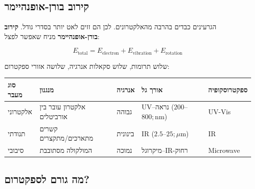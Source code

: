 \documentclass[
  hebrew,
  letterpaper,
  DIV=11,
  numbers=noendperiod]{scrreprt}
\newcounter{none} %
\begin{document}
\subsection{קירוב
בורן-אופנהיימר}\label{ux5e7ux5d9ux5e8ux5d5ux5d1-ux5d1ux5d5ux5e8ux5df-ux5d0ux5d5ux5e4ux5e0ux5d4ux5d9ux5d9ux5deux5e8}

הגרעינים כבדים בהרבה מהאלקטרונים. לכן הם זזים לאט יותר בסדרי גודל.
\textbf{קירוב בורן-אופנהיימר} מניח שאפשר לפצל:

\[E_\text{total} = E_\text{electron} + E_\text{vibration} + E_\text{rotation}\]

שלוש תרומות, שלוש סקאלות אנרגיה, שלושה אזורי ספקטרום:

{\def\LTcaptype{none} %
\begin{longtable}[]{@{}
  >{\raggedright\arraybackslash}p{}
  >{\raggedright\arraybackslash}p{}
  >{\raggedright\arraybackslash}p{}
  >{\raggedright\arraybackslash}p{}
  >{\raggedright\arraybackslash}p{}@{}}
\toprule\noalign{}
\begin{minipage}[b]{\linewidth}\raggedright
סוג מעבר
\end{minipage} & \begin{minipage}[b]{\linewidth}\raggedright
מנגנון
\end{minipage} & \begin{minipage}[b]{\linewidth}\raggedright
אנרגיה
\end{minipage} & \begin{minipage}[b]{\linewidth}\raggedright
אורך גל
\end{minipage} & \begin{minipage}[b]{\linewidth}\raggedright
ספקטרוסקופיה
\end{minipage} \\
\midrule\noalign{}
\endhead
\bottomrule\noalign{}
\endlastfoot
אלקטרוני & אלקטרון עובר בין אורביטלים & גבוהה & UV--נראה
(\(200\)--\(800;\text{nm}\)) & UV-Vis \\
תנודתי & קשרים מתארכים/מתקצרים & בינונית & IR
(\(2.5\)--\(25;\mu\text{m}\)) & IR \\
סיבובי & המולקולה מסתובבת & נמוכה & מיקרוגל--IR-רחוק & Microwave \\
\end{longtable}
}

\subsection{מה גורם
לספקטרום?}\label{ux5deux5d4-ux5d2ux5d5ux5e8ux5dd-ux5dcux5e1ux5e4ux5e7ux5d8ux5e8ux5d5ux5dd}
\end{document}
